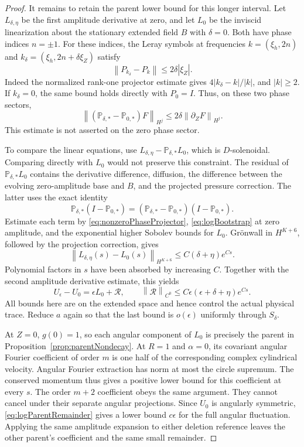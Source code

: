 \documentclass[11pt]{article}
\theoremstyle{remark}
\newcommand{\norm}[1]{\left\lVert#1\right\rVert}
\begin{document}
\begin{proof}
It remains to retain the parent lower bound for this longer interval.
Let $L_{\delta,\eta}$ be the first amplitude derivative at zero,
and let $L_0$ be the inviscid linearization about the stationary
extended field $B$ with $\delta=0$. Both have phase indices $n=\pm1$.
For these indices, the Leray symbols at frequencies
$k=(\xi_h,2n)$ and $k_\delta=(\xi_h,2n+\delta\xi_Z)$ satisfy
\begin{equation}\label{eq:nonzeroPhaseProjector}
 \norm{P_{k_\delta}-P_k}\leq2\delta|\xi_Z|.
\end{equation}
Indeed the normalized rank-one projector estimate gives
$4|k_\delta-k|/|k|$, and $|k|\geq2$. If $k_\delta=0$,
the same bound holds directly with $P_0=I$. Thus, on these two
phase sectors,
\[
 \norm{(\mathbb P_{\delta,*}-\mathbb P_{0,*})F}_{H^j}
                  \leq2\delta\norm{\partial_ZF}_{H^j}.
\]
This estimate is not asserted on the zero phase sector.

To compare the linear equations, use
$L_{\delta,\eta}-\mathbb P_{\delta,*}L_0$, which is
$D$-solenoidal. Comparing directly with $L_0$ would not preserve
this constraint. The residual of $\mathbb P_{\delta,*}L_0$
contains the derivative difference, diffusion, the difference between
the evolving zero-amplitude base and $B$, and the projected pressure
correction. The latter uses the exact identity
\[
 \mathbb P_{\delta,*}(I-\mathbb P_{0,*})
  =(\mathbb P_{\delta,*}-\mathbb P_{0,*})(I-\mathbb P_{0,*}).
\]
Estimate each term by \eqref{eq:nonzeroPhaseProjector},
\eqref{eq:logBootstrap} at zero amplitude, and the exponential
higher Sobolev bounds for $L_0$. Gr\"onwall in $H^{K+6}$, followed
by the projection correction, gives
\[
 \norm{L_{\delta,\eta}(s)-L_0(s)}_{H^{K+6}}
                   \leq C(\delta+\eta)e^{Cs}.
\]
Polynomial factors in $s$ have been absorbed by increasing $C$.
Together with the second amplitude derivative estimate, this yields
\begin{equation}\label{eq:logParentRemainder}
 U_\epsilon-U_0=\epsilon L_0+\mathcal R,\qquad
 \norm{\mathcal R}_{C^0}
       \leq C\epsilon(\epsilon+\delta+\eta)e^{Cs}.
\end{equation}
All bounds here are on the extended space and hence control the actual
physical trace. Reduce $a$ again so that the last bound is
$o(\epsilon)$ uniformly through $S_\delta$.

At $Z=0$, $g(0)=1$, so each angular component of $L_0$ is precisely
the parent in Proposition~\ref{prop:parentNondecay}. At $R=1$ and
$\alpha=0$, its covariant angular Fourier coefficient of order $m$
is one half of the corresponding complex cylindrical velocity.
Angular Fourier extraction has norm at most the circle supremum.
The conserved momentum thus gives a positive lower bound for this
coefficient at every $s$. The order $m+2$ coefficient obeys the same
argument. They cannot cancel under their separate angular projections.
Since $U_0$ is angularly symmetric, \eqref{eq:logParentRemainder}
gives a lower bound $c\epsilon$ for the full angular fluctuation.
Applying the same amplitude expansion to either deletion reference
leaves the other parent's coefficient and the same small remainder.


\end{proof}
\end{document}
